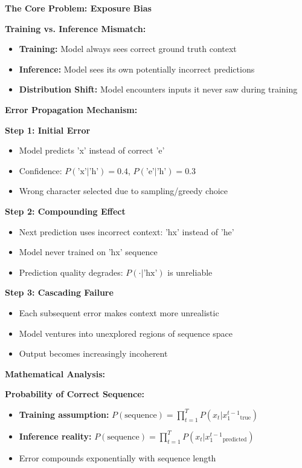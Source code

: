 \documentclass[12pt]{article}
\newcommand{\explanation}[1]{{\color{explanationcolor}#1}}
\begin{document}
\begin{enumerate}[(a)]
    \explanation{
    \textbf{The Core Problem: Exposure Bias}
    
    \textbf{Training vs. Inference Mismatch:}
    \begin{itemize}
        \item \textbf{Training:} Model always sees correct ground truth context
        \item \textbf{Inference:} Model sees its own potentially incorrect predictions
        \item \textbf{Distribution Shift:} Model encounters inputs it never saw during training
    \end{itemize}
    
    \textbf{Error Propagation Mechanism:}
    
    \textbf{Step 1: Initial Error}
    \begin{itemize}
        \item Model predicts 'x' instead of correct 'e'
        \item Confidence: $P(\text{'x'}|\text{'h'}) = 0.4$, $P(\text{'e'}|\text{'h'}) = 0.3$
        \item Wrong character selected due to sampling/greedy choice
    \end{itemize}
    
    \textbf{Step 2: Compounding Effect}
    \begin{itemize}
        \item Next prediction uses incorrect context: 'hx' instead of 'he'
        \item Model never trained on 'hx' sequence
        \item Prediction quality degrades: $P(\cdot|\text{'hx'})$ is unreliable
    \end{itemize}
    
    \textbf{Step 3: Cascading Failure}
    \begin{itemize}
        \item Each subsequent error makes context more unrealistic
        \item Model ventures into unexplored regions of sequence space
        \item Output becomes increasingly incoherent
    \end{itemize}
    
    \textbf{Mathematical Analysis:}
    
    \textbf{Probability of Correct Sequence:}
    \begin{itemize}
        \item \textbf{Training assumption:} $P(\text{sequence}) = \prod_{t=1}^T P(x_t | x_1^{t-1}_{\text{true}})$
        \item \textbf{Inference reality:} $P(\text{sequence}) = \prod_{t=1}^T P(x_t | x_1^{t-1}_{\text{predicted}})$
        \item Error compounds exponentially with sequence length
    \end{itemize}
    
}
\end{enumerate}
\end{document}
